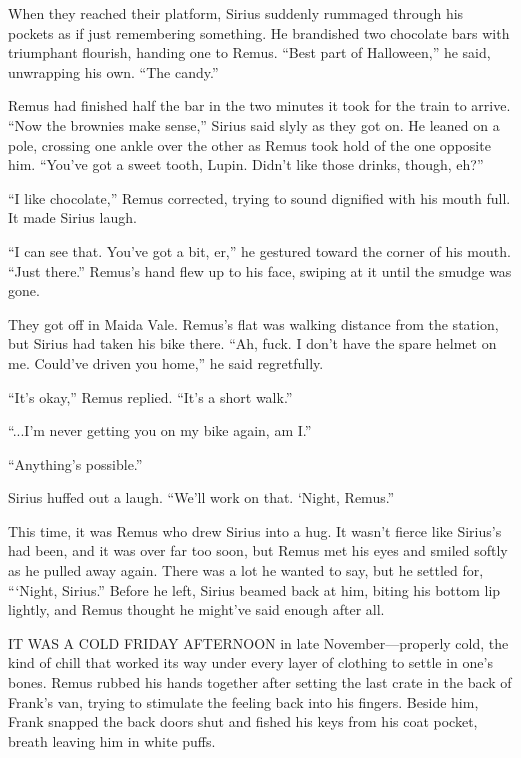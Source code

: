 When they reached their platform, Sirius suddenly rummaged through his pockets as if just remembering something. He brandished two chocolate bars with triumphant flourish, handing one to Remus. “Best part of Halloween,” he said, unwrapping his own. “The candy.”

Remus had finished half the bar in the two minutes it took for the train to arrive. “Now the brownies make sense,” Sirius said slyly as they got on. He leaned on a pole, crossing one ankle over the other as Remus took hold of the one opposite him. “You’ve got a sweet tooth, Lupin. Didn’t like those drinks, though, eh?”

“I like chocolate,” Remus corrected, trying to sound dignified with his mouth full. It made Sirius laugh.

“I can see that. You’ve got a bit, er,” he gestured toward the corner of his mouth. “Just there.” Remus’s hand flew up to his face, swiping at it until the smudge was gone.

They got off in Maida Vale. Remus’s flat was walking distance from the station, but Sirius had taken his bike there. “Ah, fuck. I don’t have the spare helmet on me. Could’ve driven you home,” he said regretfully.

“It’s okay,” Remus replied. “It’s a short walk.”

“...I’m never getting you on my bike again, am I.”

“Anything’s possible.”

Sirius huffed out a laugh. “We’ll work on that. ‘Night, Remus.”

This time, it was Remus who drew Sirius into a hug. It wasn’t fierce like Sirius’s had been, and it was over far too soon, but Remus met his eyes and smiled softly as he pulled away again. There was a lot he wanted to say, but he settled for, “‘Night, Sirius.” Before he left, Sirius beamed back at him, biting his bottom lip lightly, and Remus thought he might’ve said enough after all.


\newpage


IT WAS A COLD FRIDAY AFTERNOON in late November—properly cold, the kind of chill that worked its way under every layer of clothing to settle in one’s bones. Remus rubbed his hands together after setting the last crate in the back of Frank’s van, trying to stimulate the feeling back into his fingers. Beside him, Frank snapped the back doors shut and fished his keys from his coat pocket, breath leaving him in white puffs.

